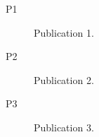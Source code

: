 \begin{publications}
\thispagestyle{myheadings}

\begin{description}
\item[\label{pubs:p1}{P1}] Publication 1.
\item[\label{pubs:p2}{P2}] Publication 2.
\item[\label{pubs:p3}{P3}] Publication 3.
\end{description}

\end{publications}
